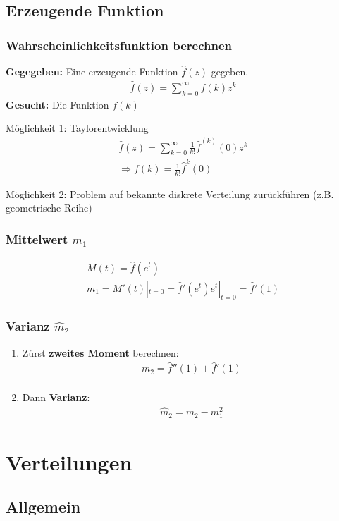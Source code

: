 \documentclass{article}
\begin{document}
\subsection{Erzeugende Funktion}
\subsubsection{Wahrscheinlichkeitsfunktion berechnen}
\textbf{Gegegeben:} Eine erzeugende Funktion $\hat{f}(z)$ gegeben.
\begin{align}
	\hat{f}(z) = \sum^{\infty}_{k=0} f(k)z^k
\end{align}
\textbf{Gesucht:} Die Funktion $f(k)$

M\"oglichkeit 1: Taylorentwicklung
\begin{align}
	\hat{f}(z) = \sum_{k=0}^{\infty} \frac{1}{k!}\hat{f}^{(k)}(0)z^k\\
	\Rightarrow f(k) = \frac{1}{k!} \hat{f}^{k}(0)
\end{align}

M\"oglichkeit 2: Problem auf bekannte diskrete Verteilung zur\"uckf\"uhren (z.B. geometrische
Reihe)
\subsubsection{Mittelwert $m_1$}
\begin{align}
	M(t) = \hat{f}(e^t)\\
	m_1  = M'(t)|_{t=0} = \hat{f}'(e^t)e^t|_{t=0} = \hat{f}'(1)
\end{align}
\subsubsection{Varianz $\hat{m}_2$}
\begin{enumerate}
	\item Z\"urst \textbf{zweites Moment} berechnen:
		\begin{align}
			m_2 = \hat{f}''(1) + \hat{f}'(1)\\
		\end{align}
	\item Dann \textbf{Varianz}:
		\begin{align}
			\hat{m}_2 = m_2 - m_1^2
		\end{align}
\end{enumerate}
\section{Verteilungen}
\subsection{Allgemein}
\end{document}
